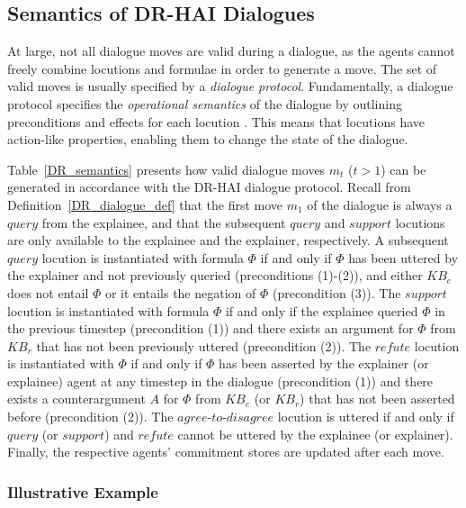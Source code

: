 \documentclass{ecai}
\begin{document}
\subsection{Semantics of DR-HAI Dialogues}

At large, not all dialogue moves are valid during a dialogue, as the agents cannot freely combine locutions and formulae in order to generate a move. The set of valid moves is usually specified by a \emph{dialogue protocol}.
Fundamentally, a dialogue protocol specifies the \emph{operational semantics} of the dialogue by outlining preconditions and effects for each locution \cite{plotkin1981structural}. This means that locutions have action-like properties, enabling them to change the state of the dialogue. 

 

 Table~\ref{DR_semantics} presents how valid dialogue moves $m_t$ ($t>1$) can be generated in accordance with the DR-HAI dialogue protocol. Recall from Definition~\ref{DR_dialogue_def} that the first move $m_1$ of the dialogue is always a $query$ from the explainee, and that the subsequent $query$ and $support$ locutions are only available to the explainee and the explainer, respectively. A subsequent $query$ locution is instantiated with formula $\Phi$ if and only if $\Phi$ has been uttered by the explainer and not previously queried (preconditions (1)-(2)), and either $KB_e$ does not entail $\Phi$ or it entails the negation of $\Phi$ (precondition (3)). The $support$ locution is instantiated with formula $\Phi$ if and only if the explainee queried $\Phi$ in the previous timestep (precondition (1)) and there exists an argument for $\Phi$ from $KB_r$ that has not been previously uttered (precondition (2)). The $refute$ locution is instantiated with $\Phi$ if and only if $\Phi$ has been asserted by the explainer (or explainee) agent at any timestep in the dialogue (precondition (1)) and there exists a counterargument $A$ for $\Phi$ from $KB_e$ (or $KB_r$) that has not been asserted before (precondition (2)). The $agree$-$to$-$disagree$ locution is uttered if and only if $query$ (or $support$) and $refute$ cannot be uttered by the explainee (or explainer). Finally, the respective agents' commitment stores are updated after each move.












\subsubsection{Illustrative Example}
\label{example}
\end{document}
